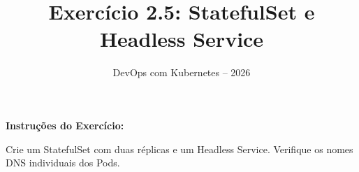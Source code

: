 \documentclass[11pt,a4paper]{article}
\title{\color{secondary}\Huge\textbf{Exercício 2.5: StatefulSet e Headless Service}}
\author{\color{primary}DevOps com Kubernetes -- 2026}
\date{}
\begin{document}
\maketitle


\textbf{Instruções do Exercício:}

\begin{tcolorbox}[colback=blue!5!white,colframe=blue!75!black]
Crie um StatefulSet com duas réplicas e um Headless Service. Verifique os nomes DNS individuais dos Pods.
\end{tcolorbox}
\end{document}
